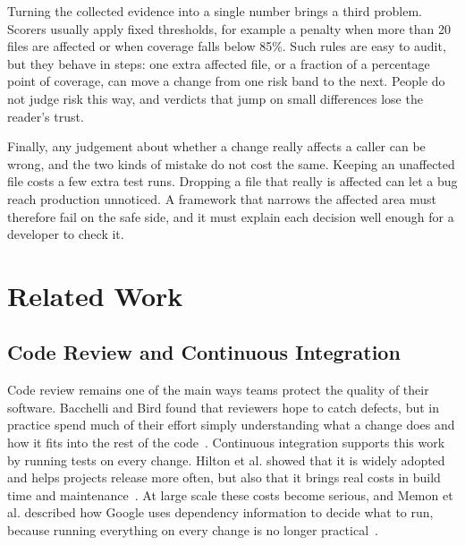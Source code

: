 \documentclass[conference]{IEEEtran}
\begin{document}
Turning the collected evidence into a single number brings a third problem. Scorers usually apply fixed thresholds, for example a penalty when more than 20 files are affected or when coverage falls below 85\%. Such rules are easy to audit, but they behave in steps: one extra affected file, or a fraction of a percentage point of coverage, can move a change from one risk band to the next. People do not judge risk this way, and verdicts that jump on small differences lose the reader's trust.

Finally, any judgement about whether a change really affects a caller can be wrong, and the two kinds of mistake do not cost the same. Keeping an unaffected file costs a few extra test runs. Dropping a file that really is affected can let a bug reach production unnoticed. A framework that narrows the affected area must therefore fail on the safe side, and it must explain each decision well enough for a developer to check it.

\section{Related Work}
\label{sec:related}

\subsection{Code Review and Continuous Integration}
Code review remains one of the main ways teams protect the quality of their software. Bacchelli and Bird found that reviewers hope to catch defects, but in practice spend much of their effort simply understanding what a change does and how it fits into the rest of the code~\cite{bacchelli2013review}. Continuous integration supports this work by running tests on every change. Hilton et al. showed that it is widely adopted and helps projects release more often, but also that it brings real costs in build time and maintenance~\cite{hilton2016ci}. At large scale these costs become serious, and Memon et al. described how Google uses dependency information to decide what to run, because running everything on every change is no longer practical~\cite{memon2017taming}.
\end{document}

